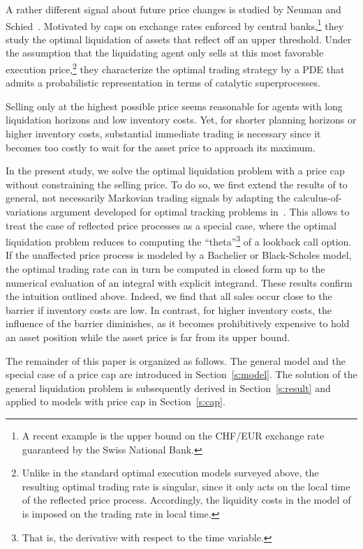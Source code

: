 \documentclass[11pt]{article}
\numberwithin{equation}{section}
\theoremstyle{definition}
\theoremstyle{remark}
\begin{document}
A rather different signal about future price changes is studied by Neuman and Schied~\cite{neuman.schied.16}. Motivated by caps on exchange rates enforced by central banks,\footnote{A recent example is the upper bound on the CHF/EUR exchange rate guaranteed by the Swiss National Bank.} they study the optimal liquidation of assets that reflect off an upper threshold.  Under the assumption that the liquidating agent only sells at this most favorable execution price,\footnote{Unlike in the standard optimal execution models surveyed above, the resulting optimal trading rate is singular, since it only acts on the local time of the reflected price process. Accordingly, the liquidity costs in the model of \cite{neuman.schied.16} is imposed on the trading rate in local time.} they characterize the optimal trading strategy by a PDE that admits a probabilistic representation in terms of catalytic superprocesses. 

Selling only at the highest possible price seems reasonable for agents with long liquidation horizons and low inventory costs. Yet, for shorter planning horizons or higher inventory costs, substantial immediate trading is necessary since it becomes too costly to wait for the asset price to approach its maximum.

In the present study, we solve the optimal liquidation problem with a price cap without constraining the selling price. To do so, we first extend the results of \cite{lehalle2017incorporating} to general, not necessarily Markovian trading signals by adapting the calculus-of-variations argument developed for optimal tracking problems in~\cite{bank2017hedging,bouchard2017equilibrium}. This allows to treat the case of reflected price processes as a special case, where the optimal liquidation problem reduces to computing the ``theta''\footnote{That is, the derivative with respect to the time variable.} of a lookback call option. If the unaffected price process is modeled by a Bachelier or Black-Scholes model, the optimal trading rate can in turn be computed in closed form up to the numerical evaluation of an integral with explicit integrand.
These results confirm the intuition outlined above. Indeed, we find that all sales occur close to the barrier if inventory costs are low. In contrast, for higher inventory costs, the influence of the barrier diminishes, as it becomes prohibitively expensive to hold an asset position while the asset price is far from its upper bound.

The remainder of this paper is organized as follows. The general model and the special case of a price cap are introduced in Section~\ref{s:model}. The solution of the general liquidation problem is subsequently derived in Section~\ref{s:result} and applied to models with price cap in Section~\ref{s:cap}.
\end{document}
